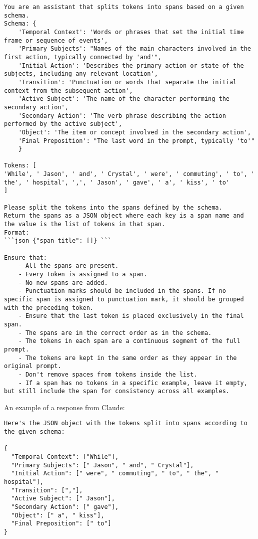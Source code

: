 \begin{lstlisting}
You are an assistant that splits tokens into spans based on a given schema.
Schema: {
    'Temporal Context': 'Words or phrases that set the initial time frame or sequence of events',
    'Primary Subjects': "Names of the main characters involved in the first action, typically connected by 'and'",
    'Initial Action': 'Describes the primary action or state of the subjects, including any relevant location',
    'Transition': 'Punctuation or words that separate the initial context from the subsequent action',
    'Active Subject': 'The name of the character performing the secondary action',
    'Secondary Action': 'The verb phrase describing the action performed by the active subject',
    'Object': 'The item or concept involved in the secondary action',
    'Final Preposition': "The last word in the prompt, typically 'to'"
    } 
        
Tokens: [
'While', ' Jason', ' and', ' Crystal', ' were', ' commuting', ' to', ' the', ' hospital', ',', ' Jason', ' gave', ' a', ' kiss', ' to'
]
    
Please split the tokens into the spans defined by the schema.
Return the spans as a JSON object where each key is a span name and the value is the list of tokens in that span.
Format: 
```json {"span title": []} ``` 

Ensure that:
    - All the spans are present.
    - Every token is assigned to a span.
    - No new spans are added.
    - Punctuation marks should be included in the spans. If no specific span is assigned to punctuation mark, it should be grouped with the preceding token.
    - Ensure that the last token is placed exclusively in the final span. 
    - The spans are in the correct order as in the schema.
    - The tokens in each span are a continuous segment of the full prompt.
    - The tokens are kept in the same order as they appear in the original prompt.
    - Don't remove spaces from tokens inside the list.
    - If a span has no tokens in a specific example, leave it empty, but still include the span for consistency across all examples.
\end{lstlisting}


An example of a response from Claude:

\begin{lstlisting}
Here's the JSON object with the tokens split into spans according to the given schema:

{
  "Temporal Context": ["While"],
  "Primary Subjects": [" Jason", " and", " Crystal"],
  "Initial Action": [" were", " commuting", " to", " the", " hospital"],
  "Transition": [","],
  "Active Subject": [" Jason"],
  "Secondary Action": [" gave"],
  "Object": [" a", " kiss"],
  "Final Preposition": [" to"]
}
\end{lstlisting}

